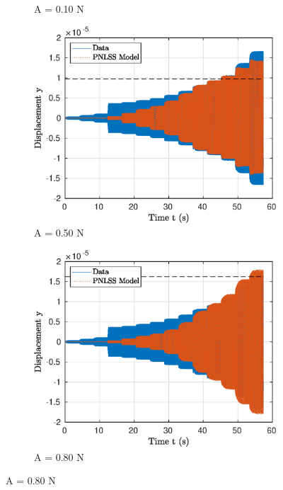 \documentclass[aspectratio=169]{beamer}
\begin{document}
\begin{frame}[allowframebreaks]
\begin{figure}[!h]
\begin{subfigure}[!h]{0.2\linewidth}
      \caption{A = 0.10 N}      
    \end{subfigure}%
    \begin{subfigure}[!h]{0.2\linewidth}
      \includegraphics[width=\linewidth]{../../benchmark4/FIGURES/PNLSS_PLL_TRESP_famp05_nx23}
      \caption{A = 0.50 N}      
    \end{subfigure}%
    \begin{subfigure}[!h]{0.2\linewidth}
      \includegraphics[width=\linewidth]{../../benchmark4/FIGURES/PNLSS_PLL_TRESP_famp08_nx23}
      \caption{A = 0.80 N}      
    \end{subfigure}%

\end{figure}
\end{frame}
\end{document}
